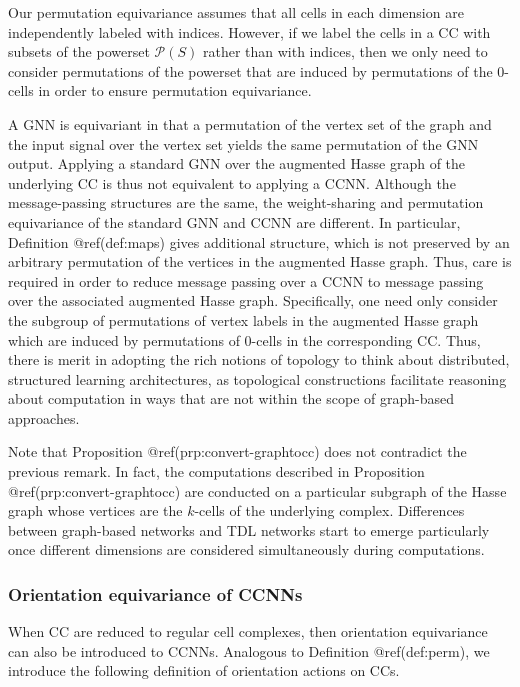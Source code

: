 \documentclass[
  12pt,
]{krantz}
\begin{document}
Our permutation equivariance assumes that all cells in each dimension
are independently labeled with indices. However, if we label the cells
in a CC with subsets of the powerset \(\mathcal{P}(S)\) rather than with
indices, then we only need to consider permutations of the powerset that
are induced by permutations of the 0-cells in order to ensure
permutation equivariance.

A GNN is equivariant in that a permutation of the vertex set of the
graph and the input signal over the vertex set yields the same
permutation of the GNN output. Applying a standard GNN over the
augmented Hasse graph of the underlying CC is thus not equivalent to
applying a CCNN. Although the message-passing structures are the same,
the weight-sharing and permutation equivariance of the standard GNN and
CCNN are different. In particular, Definition @ref(def:maps) gives
additional structure, which is not preserved by an arbitrary permutation
of the vertices in the augmented Hasse graph. Thus, care is required in
order to reduce message passing over a CCNN to message passing over the
associated augmented Hasse graph. Specifically, one need only consider
the subgroup of permutations of vertex labels in the augmented Hasse
graph which are induced by permutations of 0-cells in the corresponding
CC. Thus, there is merit in adopting the rich notions of topology to
think about distributed, structured learning architectures, as
topological constructions facilitate reasoning about computation in ways
that are not within the scope of graph-based approaches.

Note that Proposition @ref(prp:convert-graphtocc) does not contradict
the previous remark. In fact, the computations described in Proposition
@ref(prp:convert-graphtocc) are conducted on a particular subgraph of
the Hasse graph whose vertices are the \(k\)-cells of the underlying
complex. Differences between graph-based networks and TDL networks start
to emerge particularly once different dimensions are considered
simultaneously during computations.

\subsubsection{Orientation equivariance of
CCNNs}\label{orientation-equivariance-of-ccnns}

When CC are reduced to regular cell complexes, then orientation
equivariance can also be introduced to CCNNs. Analogous to Definition
@ref(def:perm), we introduce the following definition of orientation
actions on CCs.
\end{document}
